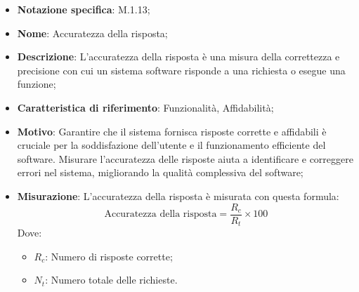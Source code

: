 \begin{itemize}
    \item \textbf{Notazione specifica}: M.1.13;
    \item \textbf{Nome}: Accuratezza della risposta;
    \item \textbf{Descrizione}: L'accuratezza della risposta è una misura della correttezza e precisione con cui un sistema software risponde a una richiesta o esegue una funzione;
    \item \textbf{Caratteristica di riferimento}: Funzionalità, Affidabilità;
    \item \textbf{Motivo}: Garantire che il sistema fornisca risposte corrette e affidabili è cruciale per la soddisfazione dell'utente e il funzionamento efficiente del software. Misurare l'accuratezza delle risposte aiuta a identificare e correggere errori nel sistema, migliorando la qualità complessiva del software;
    \item \textbf{Misurazione}: L'accuratezza della risposta è misurata con questa formula:
    \[
    \text{Accuratezza della risposta} = \frac{R_{c}}{R_{t}} \times 100
    \]
    Dove:
    \begin{itemize}
        \item $R_{c}$: Numero di risposte corrette;
        \item $N_{t}$: Numero totale delle richieste.
    \end{itemize}
    
\end{itemize}
